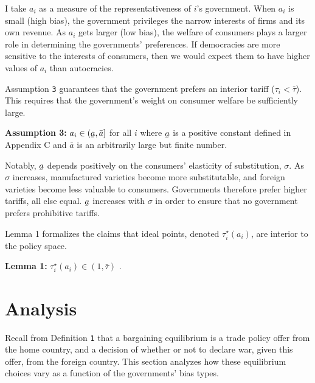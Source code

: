 \documentclass{puthesis}
\DeclareRobustCommand{\ubar}[1]{\underaccent{\bar}{#1}}
\begin{document}
I take \(a_i\) as a measure of the representativeness of \(i\)'s
government. When \(a_i\) is small (high bias), the government privileges
the narrow interests of firms and its own revenue. As \(a_i\) gets
larger (low bias), the welfare of consumers plays a larger role in
determining the governments' preferences. If democracies are more
sensitive to the interests of consumers, then we would expect them to
have higher values of \(a_i\) than autocracies.

Assumption \texttt{3} guarantees that the government prefers an interior
tariff (\(\tau_i < \bar{\tau}\)). This requires that the government's
weight on consumer welfare be sufficiently large.

\textbf{Assumption 3:} \(a_i \in (\ubar{a}, \bar{a}]\) for all \(i\)
where \(\ubar{a}\) is a positive constant defined in Appendix C and
\(\bar{a}\) is an arbitrarily large but finite number.

Notably, \(\ubar{a}\) depends positively on the consumers' elasticity of
substitution, \(\sigma\). As \(\sigma\) increases, manufactured
varieties become more substitutable, and foreign varieties become less
valuable to consumers. Governments therefore prefer higher tariffs, all
else equal. \(\ubar{a}\) increases with \(\sigma\) in order to ensure
that no government prefers prohibitive tariffs.

Lemma 1 formalizes the claims that ideal points, denoted
\(\tau_i^\star(a_i)\), are interior to the policy space.

\textbf{Lemma 1:} \(\tau_i^\star(a_i) \in (1, \bar{\tau})\) .

\section{Analysis}

Recall from Definition \texttt{1} that a bargaining equilibrium is a
trade policy offer from the home country, and a decision of whether or
not to declare war, given this offer, from the foreign country. This
section analyzes how these equilibrium choices vary as a function of the
governments' bias types.
\end{document}

